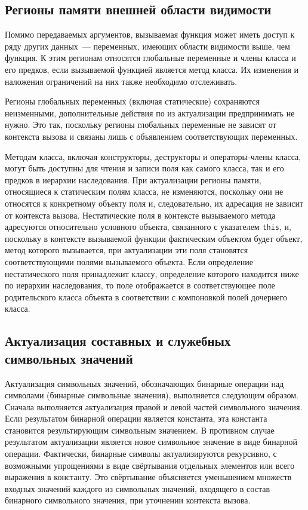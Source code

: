 \subsection{Регионы памяти внешней области видимости}

Помимо передаваемых аргументов, вызываемая функция может иметь доступ к ряду других данных~--- переменных, имеющих области видимости выше, чем функция. К этим регионам относятся глобальные переменные и члены класса и его предков, если вызываемой функцией является метод класса. Их изменения и наложения ограничений на них также необходимо отслеживать.

Регионы глобальных переменных (включая статические) сохраняются неизменными, дополнительные действия по из актуализации предпринимать не нужно. Это так, поскольку регионы глобальных переменные не зависят от контекста вызова и связаны лишь с объявлением соответствующих переменных.

Методам класса, включая конструкторы, деструкторы и операторы-члены класса, могут быть доступны для чтения и записи поля как самого класса, так и его предков в иерархии наследования. При актуализации регионы памяти, относящиеся к статическим полям класса, не изменяются, поскольку они не относятся к конкретному объекту поля и, следовательно, их адресация не зависит от контекста вызова. Нестатические поля в контексте вызываемого метода адресуются относительно условного объекта, связанного с указателем \texttt{this}, и, поскольку в контексте вызываемой функции фактическим объектом будет объект, метод которого вызывается, при актуализации эти поля становятся соответствующими полями вызываемого объекта. Если определение нестатического поля принадлежит классу, определение которого находится ниже по иерархии наследования, то поле отображается в соответствующее поле родительского класса объекта в соответствии с компоновкой полей дочернего класса.

\subsection{Актуализация составных и служебных символьных значений}

Актуализация символьных значений, обозначающих бинарные операции над символами (бинарные символьные значения), выполняется следующим образом. Сначала выполняется актуализация правой и левой частей символьного значения. Если результатом бинарной операции является константа, эта константа становится результирующим символьным значением. В противном случае результатом актуализации является новое символьное значение в виде бинарной операции. Фактически, бинарные символы актуализируются рекурсивно, с возможными упрощениями в виде свёртывания отдельных элементов или всего выражения в константу. Это свёртывание объясняется уменьшением множеств входных значений каждого из символьных значений, входящего в состав бинарного символьного значения, при уточнении контекста вызова.

